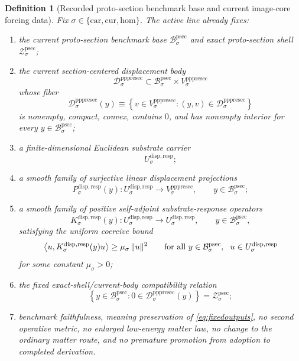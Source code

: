 \documentclass[11pt]{article}
\newcommand{\Car}{\mathrm{car}}
\newcommand{\Cur}{\mathrm{cur}}
\newcommand{\Hom}{\mathrm{hom}}
\newcommand{\ProtoSectionBody}[1]{\mathcal B_{#1}^{\mathrm{psec}}}
\newcommand{\ProtoSectionShell}[1]{\mathcal Z_{#1}^{\mathrm{psec}}}
\newcommand{\PrePreProtoSectionVertical}[1]{V_{#1}^{\mathrm{pppresec}}}
\newcommand{\PrePreProtoSectionResidualBody}[1]{\mathcal D_{#1}^{\mathrm{pppresec}}}
\newcommand{\SubstrateCarrier}[1]{U_{#1}^{\mathrm{disp,resp}}}
\newcommand{\SubstrateProjection}[1]{P_{#1}^{\mathrm{disp,resp}}}
\newcommand{\SubstrateOperator}[1]{K_{#1}^{\mathrm{disp,resp}}}
\newtheorem{definition}{Definition}
\begin{document}
\begin{definition}[Recorded proto-section benchmark base and current image-core forcing data]
\label{def:route}
Fix \(\sigma\in\{\Car,\Cur,\Hom\}\). The active line already fixes:
\begin{enumerate}
    \item the current proto-section benchmark base \(\ProtoSectionBody{\sigma}\) and exact proto-section shell \(\ProtoSectionShell{\sigma}\);
    \item the current section-centered displacement body
    \[
    \PrePreProtoSectionResidualBody{\sigma}
    \subset
    \ProtoSectionBody{\sigma}\times\PrePreProtoSectionVertical{\sigma}
    \]
    whose fiber
    \[
    \PrePreProtoSectionResidualBody{\sigma}(y)
    \equiv
    \left\{
    v\in\PrePreProtoSectionVertical{\sigma}:(y,v)\in\PrePreProtoSectionResidualBody{\sigma}
    \right\}
    \]
    is nonempty, compact, convex, contains \(0\), and has nonempty interior for every \(y\in\ProtoSectionBody{\sigma}\);
    \item a finite-dimensional Euclidean substrate carrier
    \[
    \SubstrateCarrier{\sigma};
    \]
    \item a smooth family of surjective linear displacement projections
    \[
    \SubstrateProjection{\sigma}(y):
    \SubstrateCarrier{\sigma}\to\PrePreProtoSectionVertical{\sigma},
    \qquad
    y\in\ProtoSectionBody{\sigma};
    \]
    \item a smooth family of positive self-adjoint substrate-response operators
    \[
    \SubstrateOperator{\sigma}(y):
    \SubstrateCarrier{\sigma}\to\SubstrateCarrier{\sigma},
    \qquad
    y\in\ProtoSectionBody{\sigma},
    \]
    satisfying the uniform coercive bound
    \begin{equation}
    \ev{u,\SubstrateOperator{\sigma}(y)u}
    \ge
    \mu_{\sigma}\,\|u\|^2
    \qquad
    \text{for all }
    y\in\ProtoSectionBody{\sigma},
    \ \ u\in\SubstrateCarrier{\sigma}
    \label{eq:coercive}
    \end{equation}
    for some constant \(\mu_{\sigma}>0\);
    \item the fixed exact-shell/current-body compatibility relation
    \[
    \left\{
    y\in\ProtoSectionBody{\sigma}:0\in\PrePreProtoSectionResidualBody{\sigma}(y)
    \right\}
    =
    \ProtoSectionShell{\sigma};
    \]
    \item benchmark faithfulness, meaning preservation of \eqref{eq:fixedoutputs}, no second operative metric, no enlarged low-energy matter law, no change to the ordinary matter route, and no premature promotion from adoption to completed derivation.
\end{enumerate}
\end{definition}
\end{document}
